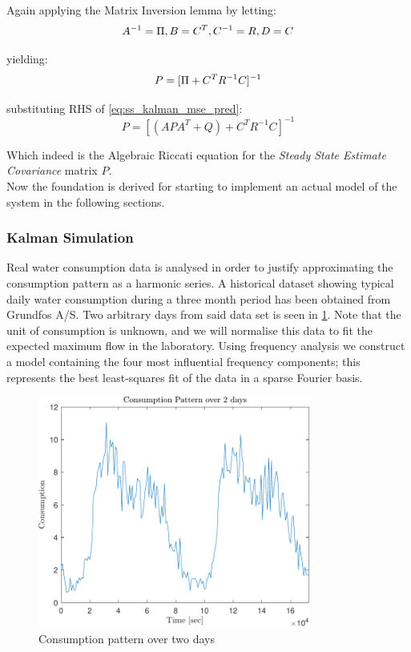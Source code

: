 Again applying the Matrix Inversion lemma by letting:
\begin{equation}\label{eq:ss_kalman_udledning5_v3}
		{A}^{-1} = \Pi, {B} = {C}^T, {C}^{-1} = {R}, {D} = {C} \\
\end{equation}

yielding:
\begin{equation}\label{eq:ss_kalman_udledning5_v4}
		P = [\Pi + {C}^T{R}^{-1}{C}]^{-1} \\ 
\end{equation}     

substituting RHS of \cref{eq:ss_kalman_mse_pred}:
\begin{equation}
		P = [({A}P{A}^T + {Q}) + {C}^T{R}^{-1}{C}]^{-1}  \label{eq:ss_kalman_udledning6}
\end{equation}

Which indeed is the Algebraic Riccati equation for the \textit{Steady State Estimate Covariance} matrix $P$.\\
Now the foundation is derived for starting to implement an actual model of the system in the following sections.

\subsubsection{Kalman Simulation}\label{sec:kalman_imp}
Real water consumption data is analysed in order to justify approximating the consumption pattern as a harmonic series. A historical dataset showing typical daily water consumption during a three month period has been obtained from Grundfos A/S. Two arbitrary days from said data set is seen in \cref{fig:Consumptionpattern}. Note that the unit of consumption is unknown, and we will normalise this data to fit the expected maximum flow in the laboratory.  Using frequency analysis we construct a model containing the four most influential frequency components; this represents the best least-squares fit of the data in a sparse Fourier basis.

\begin{figure}[h!]
	\centering
	\includegraphics[width=0.8\textwidth]{Pictures/ConsumptionPattern.pdf}
	
	\caption{Consumption pattern over two days}
	\label{fig:Consumptionpattern}
\end{figure}

